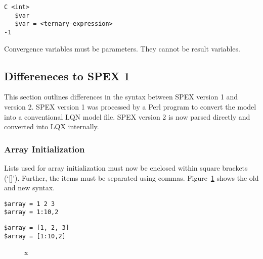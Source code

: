 \lstset{language=LQN,basicstyle=\ttfamily,numbersep=10pt,firstnumber=1}
\begin{lstlisting}[caption={Convergence Information},label=lst:lqn-convergence-info,frame=single]
C <int>
   $var
   $var = <ternary-expression>
-1
\end{lstlisting}

Convergence variables must be parameters.  They cannot be
result variables.

\subsection{Differeneces to SPEX 1}

This section outlines differences in the syntax between SPEX version 1 and version 2.
SPEX version 1 was processed by a Perl program to convert the model into a conventional LQN
model file.  SPEX version 2 is now parsed directly and converted into LQX internally.

\subsubsection{Array Initialization}

Lists used for array initialization must now be enclosed within square brackets
(`[]')\index{[]}.  Further, the items must be separated using
commas. Figure~\ref{fig:spex-array-initialization} shows the old and new syntax.
\newsavebox{\spexone}
\newsavebox{\spextwo}
\begin{lrbox}{\spexone}
\begin{minipage}{.3\textwidth}
\begin{lstlisting}
$array = 1 2 3
$array = 1:10,2
\end{lstlisting}
\end{minipage}
\end{lrbox}
\begin{lrbox}{\spextwo}
\begin{minipage}{.3\textwidth}
\begin{lstlisting}
$array = [1, 2, 3]
$array = [1:10,2]
\end{lstlisting}
\end{minipage}
\end{lrbox}
\begin{figure}
  \centering
  \subfloat[Spex 1]{\usebox{\spexone}}
  \subfloat[Spex 2]{\usebox{\spextwo}}
  \caption{x}
  \label{fig:spex-array-initialization}
\end{figure}

